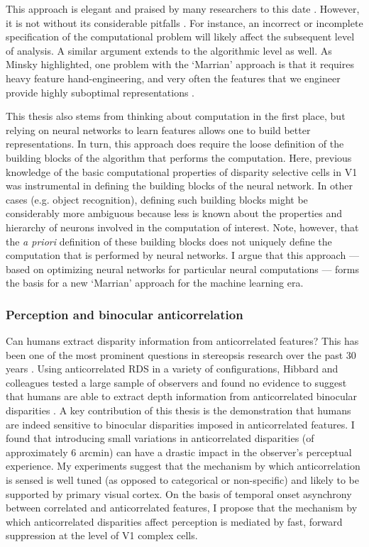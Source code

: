 This approach is elegant and praised by many researchers to this date \cite{Carandini:2012ce,POGGIO1981258}. However, it is not without its considerable pitfalls \cite{Anderson:2015fu,doi:10.1068/p7275}. For instance, an incorrect or incomplete specification of the computational problem will likely affect the subsequent level of analysis. A similar argument extends to the algorithmic level as well. As Minsky highlighted, one problem with the `Marrian' approach is that it requires heavy feature hand-engineering, and very often the features that we engineer provide highly suboptimal representations \cite{Stork:1996:HLC:548366}.

This thesis also stems from thinking about computation in the first place, but relying on neural networks to learn features allows one to build better representations. In turn, this approach does require the loose definition of the building blocks of the algorithm that performs the computation. Here, previous knowledge of the basic computational properties of disparity selective cells in V1 was instrumental in defining the building blocks of the neural network. In other cases (e.g. object recognition), defining such building blocks might be considerably more ambiguous because less is known about the properties and hierarchy of neurons involved in the computation of interest. Note, however, that the \textit{a priori} definition of these building blocks does not uniquely define the computation that is performed by neural networks. I argue that this approach --- based on optimizing neural networks for particular neural computations --- forms the basis for a new `Marrian' approach for the machine learning era.


\subsubsection*{Perception and binocular anticorrelation}

Can humans extract disparity information from anticorrelated features? This has been one of the most prominent questions in stereopsis research over the past 30 years \cite{JULESZ:1964ff,Cogan:1993yr,Cumming:1998ib,Read:2000kx}. Using anticorrelated RDS in a variety of configurations, Hibbard and colleagues tested a large sample of observers and found no evidence to suggest that humans are able to extract depth information from anticorrelated binocular disparities \cite{Hibbard2014}. A key contribution of this thesis is the demonstration that humans are indeed sensitive to binocular disparities imposed in anticorrelated features. I found that introducing small variations in anticorrelated disparities (of approximately 6 arcmin) can have a drastic impact in the observer's perceptual experience. My experiments suggest that the mechanism by which anticorrelation is sensed is well tuned (as opposed to categorical or non-specific) and likely to be supported by primary visual cortex. On the basis of temporal onset asynchrony between correlated and anticorrelated features, I propose that the mechanism by which anticorrelated disparities affect perception is mediated by fast, forward suppression at the level of V1 complex cells.


